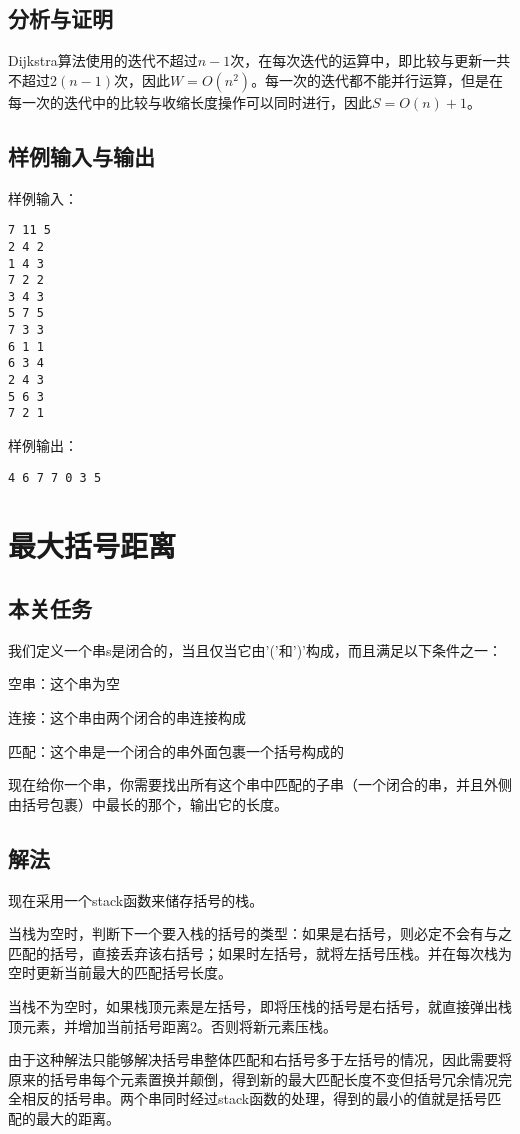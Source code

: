 \documentclass[UTF8,a4paperdui, %
]{ctexart}
\begin{document}
\subsection{分析与证明}
Dijkstra算法使用的迭代不超过$n-1$次，在每次迭代的运算中，即比较与更新一共不超过$2(n-1)$次，因此$W=O(n^2)$。每一次的迭代都不能并行运算，但是在每一次的迭代中的比较与收缩长度操作可以同时进行，因此$S=O(n)+1$。
\subsection{样例输入与输出}
样例输入：
\begin{lstlisting}
7 11 5
2 4 2
1 4 3
7 2 2
3 4 3
5 7 5
7 3 3
6 1 1
6 3 4
2 4 3
5 6 3
7 2 1
\end{lstlisting}
样例输出：
\begin{lstlisting}
4 6 7 7 0 3 5 
\end{lstlisting}

\section{最大括号距离}
\subsection{本关任务}
我们定义一个串s是闭合的，当且仅当它由'('和')'构成，而且满足以下条件之一：

空串：这个串为空

连接：这个串由两个闭合的串连接构成

匹配：这个串是一个闭合的串外面包裹一个括号构成的

现在给你一个串，你需要找出所有这个串中匹配的子串（一个闭合的串，并且外侧由括号包裹）中最长的那个，输出它的长度。
\subsection{解法}
现在采用一个stack函数来储存括号的栈。

当栈为空时，判断下一个要入栈的括号的类型：如果是右括号，则必定不会有与之匹配的括号，直接丢弃该右括号；如果时左括号，就将左括号压栈。并在每次栈为空时更新当前最大的匹配括号长度。

当栈不为空时，如果栈顶元素是左括号，即将压栈的括号是右括号，就直接弹出栈顶元素，并增加当前括号距离2。否则将新元素压栈。

由于这种解法只能够解决括号串整体匹配和右括号多于左括号的情况，因此需要将原来的括号串每个元素置换并颠倒，得到新的最大匹配长度不变但括号冗余情况完全相反的括号串。两个串同时经过stack函数的处理，得到的最小的值就是括号匹配的最大的距离。
\end{document}
